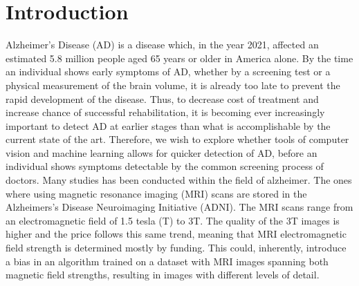 \documentclass[12pt, fleqn, titlepage]{article}
\newcommand{\1}[1]{\mathds{1}\left[#1\right]}
\begin{document}
\begin{abstract}
	
\end{abstract}

{
\hypersetup{linkcolor=black}
\tableofcontents 
\newpage
}

\section{Introduction} \label{indledning}
Alzheimer’s Disease (AD) is a disease which, in the year 2021, affected an
estimated 5.8 million people aged 65 years or older in America alone. By the
time an individual shows early symptoms of AD, whether by a screening test
or a physical measurement of the brain volume, it is already too late to prevent the rapid development of the disease. Thus, to decrease cost of treatment
and increase chance of successful rehabilitation, it is becoming ever increasingly
important to detect AD at earlier stages than what is accomplishable by the
current state of the art. Therefore, we wish to explore whether tools of computer vision and machine learning allows for quicker detection of AD, before
an individual shows symptoms detectable by the common screening process of
doctors. Many studies has been conducted within the field of alzheimer. The ones where using magnetic resonance imaging (MRI) scans are stored
in the Alzheimers’s Disease Neuroimaging Initiative (ADNI). The MRI scans
range from an electromagnetic field of 1.5 tesla (T) to 3T. The quality of the 3T
images is higher and the price follows this same trend, meaning that MRI electromagnetic field strength is determined mostly by funding. This could, inherently, introduce a bias in an algorithm trained on a dataset with MRI images
spanning both magnetic field strengths, resulting in images with different levels
of detail.
\end{document}
